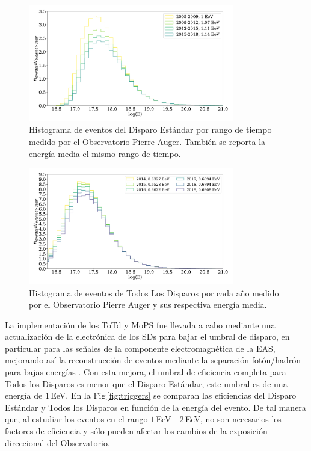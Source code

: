\begin{figure}[H]
	\centering
	\includegraphics[width=0.8\textwidth]{histograma_Standard.pdf}
	\caption{Histograma de eventos  del Disparo Estándar por rango de tiempo medido por el Observatorio Pierre Auger. También se reporta la energía media el mismo rango de tiempo.}
	\label{fig:futuro}
\end{figure}


\begin{figure}[H]
	\centering
	\includegraphics[width=0.8\textwidth]{histograma_AllTriggers_v2.pdf}
  \caption{Histograma de eventos de  Todos Los Disparos por cada año medido por el Observatorio Pierre Auger y sus respectiva energía media. }
	\label{fig:TLD}
\end{figure}

La implementación de los ToTd y MoPS fue llevada a cabo mediante una actualización de la electrónica de los SDs para bajar el umbral de disparo, en particular para las señales de la componente electromagnética de la EAS, mejorando así la reconstrucción de eventos mediante la separación fotón/hadrón para bajas energías  \cite{pierre2013plans}. Con esta mejora, el umbral de eficiencia completa para Todos los Disparos es menor que el Disparo Estándar, este umbral es de una energía de $1\,$EeV. En la Fig\,\ref{fig:triggers} se comparan las eficiencias del Disparo Estándar y Todos los Disparos en función de la energía del evento. De tal manera que, al estudiar los eventos en el rango $1\,$EeV - $2\,$EeV,  no son necesarios los factores de eficiencia y sólo pueden afectar los cambios de la exposición direccional del Observatorio.


